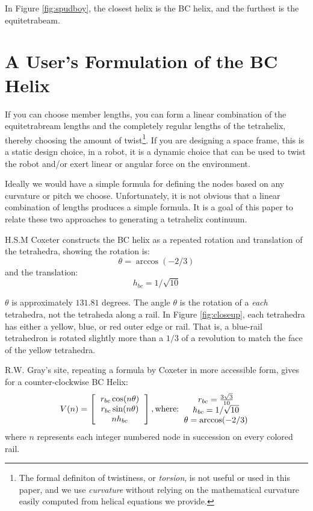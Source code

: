 \documentclass[11pt]{article}
\begin{document}
In Figure \ref{fig:spudboy}, the closest helix is the BC helix, and the furthest
is the equitetrabeam.

\section{A User's Formulation of the BC Helix}

If you can choose member lengths, you can form a linear combination of
the equitetrabream lengths and the completely regular lengths of the
tetrahelix, thereby choosing the amount of twist\footnote{The formal definiton
  of twistiness, or \emph{torsion}, is not useful or used in this paper, and
  we use \emph{curvature} without relying on the mathematical curvature easily
  computed from helical equations we provide.}.
If you are designing a
space frame, this is a static design choice, in a robot, it is a
dynamic choice that can be used to twist the robot and/or exert linear or
angular force on the environment.

Ideally we would have a simple formula for defining the nodes based on
any curvature or pitch we choose.  Unfortunately, it is not obvious that a linear
combination of lengths produces a simple formula.  It is a goal of
this paper to relate these two approaches to generating a tetrahelix
continuum.


H.S.M Coxeter constructs the BC helix\cite{coxeter1985simplicial} as a repeated rotation and translation of the tetrahedra, showing the
rotation is:
\[
\theta = \arccos(-2/3) 
\]
and the translation:
\[
h_{bc} = 1/\sqrt{10}
\]

$\theta$ is approximately $131.81$ degrees.
The angle $\theta$ is the rotation of a \emph{each} tetrahedra, not the tetraheda along a rail.  In Figure \ref{fig:closeup},
each tetrahedra has either a yellow, blue, or red outer edge or rail.
That is, a blue-rail tetrahedron is rotated slightly more than a $1/3$ of a revolution to match the face of the yellow tetrahedra.

R.W. Gray's site\cite{graytetrahelix}, repeating a formula by Coxeter\cite{coxeter1985simplicial} in more accessible form, gives for a counter-clockwise BC Helix:
\begin{equation}
  \label{graycoxeter}
V(n) =
\left [
  \begin{tabular}{c}
   $ r_{bc} \cos(n \theta) $\\
   $ r_{bc} \sin(n \theta) $\\
   $ n h_{bc}  $
  \end{tabular}
  \right ],
\text{where:}
  \begin{tabular}{c}
 $ r_{bc} = \frac{3\sqrt{3}}{10} $\\
 $ h_{bc} = 1/\sqrt{10} $ \\
 $ \theta = \arccos(-2/3) $ \\
  \end{tabular}      
\end{equation}
where $n$ represents each integer numbered node in succession on every colored rail.
\end{document}
